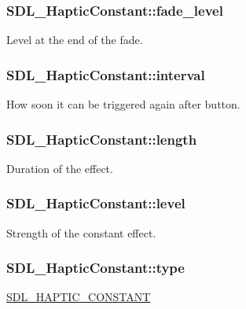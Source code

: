 \subsubsection[{fade\+\_\+level}]{ S\+D\+L\+\_\+\+Haptic\+Constant\+::fade\+\_\+level}\label{structSDL__HapticConstant_a49f6499c89f3e494efbe92f12277c949}
Level at the end of the fade. \hypertarget{structSDL__HapticConstant_ab1f7f0df856f4cf1fdf937cb886226b4}{}
\subsubsection[{interval}]{ S\+D\+L\+\_\+\+Haptic\+Constant\+::interval}\label{structSDL__HapticConstant_ab1f7f0df856f4cf1fdf937cb886226b4}
How soon it can be triggered again after button. \hypertarget{structSDL__HapticConstant_aeb994c356b1d236b060f277d157e98ec}{}
\subsubsection[{length}]{ S\+D\+L\+\_\+\+Haptic\+Constant\+::length}\label{structSDL__HapticConstant_aeb994c356b1d236b060f277d157e98ec}
Duration of the effect. \hypertarget{structSDL__HapticConstant_a5b095eea77464623ed57af15f29f4ca6}{}
\subsubsection[{level}]{ S\+D\+L\+\_\+\+Haptic\+Constant\+::level}\label{structSDL__HapticConstant_a5b095eea77464623ed57af15f29f4ca6}
Strength of the constant effect. \hypertarget{structSDL__HapticConstant_a5cb31202803a8bc1be95fcede5ac8afb}{}
\subsubsection[{type}]{ S\+D\+L\+\_\+\+Haptic\+Constant\+::type}\label{structSDL__HapticConstant_a5cb31202803a8bc1be95fcede5ac8afb}
\hyperlink{SDL__haptic_8h_a955fb9f680dcf9cc72a3d5263e85b80a}{S\+D\+L\+\_\+\+H\+A\+P\+T\+I\+C\+\_\+\+C\+O\+N\+S\+T\+A\+N\+T} 

